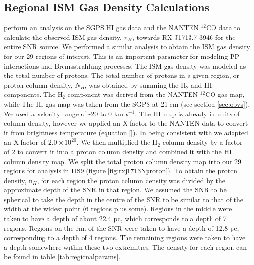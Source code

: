 \documentclass[12pt,a4paper]{article}
\begin{document}
\subsection{Regional ISM Gas Density Calculations} \label{sec:regdenscalc}
\cite{2012ApJ...746...82F} perform an analysis on the SGPS HI gas data and the NANTEN $^{12}$CO data to calculate the observed ISM gas density, $n_H$, towards RX J1713.7-3946 for the entire SNR source. We performed a similar analysis to obtain the ISM gas density for our 29 regions of interest. This is an important parameter for modeling PP interactions and Bremsstrahlung processes. The ISM gas density was modeled as the total number of protons. The total number of protons in a given region, or proton column density, $N_H$, was obtained by summing the H$_2$ and HI components. The H$_2$ component was derived from the NANTEN $^{12}$CO gas map, while The HI gas map was taken from the SGPS at 21 cm (see section \ref{sec:obvs}). We used a velocity range of -20 to 0 km s$^{-1}$. The HI map is already in units of column density, however we applied an X factor to the NANTEN data to convert it from brightness temperature (equation \ref{}). In being consistent with \cite{2012ApJ...746...82F} we adopted an X factor of $2.0 \times 10^{20}$. We then multiplied the H$_2$ column density by a factor of 2 to convert it into a proton column density and combined it with the HI column density map. We split the total proton column density map into our 29 regions for analysis in DS9 (figure \ref{fig:rxj1713Nproton}). To obtain the proton density, n$_H$, for each region the proton column density was divided by the approximate depth of the SNR in that region. We assumed the SNR to be spherical to take the depth in the centre of the SNR to be similar to that of the width at the widest point (6 regions plus some). Regions in the middle were taken to have a depth of about 22.4 pc, which corresponds to a depth of 7 regions. Regions on the rim of the SNR were taken to have a depth of 12.8 pc, corresponding to a depth of 4 regions. The remaining regions were taken to have a depth somewhere within these two extremities. The density for each region can be found in table \ref{tab:regionalparams}.
\end{document}
